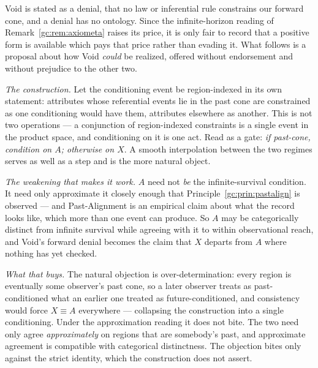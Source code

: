 \begin{remark}\label{gc:rem:voidontology}
Void is stated as a denial, that no law or inferential rule
constrains our forward cone, and a denial has no ontology. Since the
infinite-horizon reading of Remark~\ref{gc:rem:axiometa} raises its price, it is only fair to
record that a positive form is available which pays that price rather
than evading it. What follows is a proposal about how Void \emph{could}
be realized, offered without endorsement and without prejudice to the
other two.

\emph{The construction.} Let the conditioning event be region-indexed in
its own statement: attributes whose referential events lie in the past
cone are constrained as one conditioning would have them, attributes
elsewhere as another. This is not two operations --- a conjunction of
region-indexed constraints is a single event in the product space, and
conditioning on it is one act. Read as a gate: \emph{if past-cone,
condition on $A$; otherwise on $X$}. A smooth interpolation between the
two regimes serves as well as a step and is the more natural object.

\emph{The weakening that makes it work.} $A$ need not \emph{be} the
infinite-survival condition. It need only approximate it closely enough
that Principle~\ref{gc:prin:pastalign} is observed --- and
Past-Alignment is an empirical claim about what the record looks like,
which more than one event can produce. So $A$ may be categorically
distinct from infinite survival while agreeing with it to within
observational reach, and Void's forward denial becomes the claim that
$X$ departs from $A$ where nothing has yet checked.

\emph{What that buys.} The natural objection is over-determination:
every region is eventually some observer's past cone, so a later
observer treats as past-conditioned what an earlier one treated as
future-conditioned, and consistency would force $X\equiv A$ everywhere
--- collapsing the construction into a single conditioning. Under the
approximation reading it does not bite. The two need only agree
\emph{approximately} on regions that are somebody's past, and
approximate agreement is compatible with categorical distinctness. The
objection bites only against the strict identity, which the construction
does not assert.


\end{remark}

